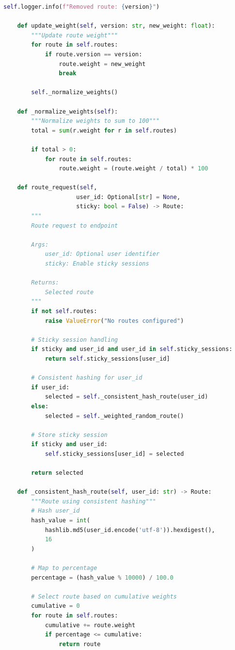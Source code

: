 \begin{lstlisting}[language=Python, caption=Advanced Traffic Router]
        self.logger.info(f"Removed route: {version}")

    def update_weight(self, version: str, new_weight: float):
        """Update route weight"""
        for route in self.routes:
            if route.version == version:
                route.weight = new_weight
                break

        self._normalize_weights()

    def _normalize_weights(self):
        """Normalize weights to sum to 100"""
        total = sum(r.weight for r in self.routes)

        if total > 0:
            for route in self.routes:
                route.weight = (route.weight / total) * 100

    def route_request(self,
                     user_id: Optional[str] = None,
                     sticky: bool = False) -> Route:
        """
        Route request to endpoint

        Args:
            user_id: Optional user identifier
            sticky: Enable sticky sessions

        Returns:
            Selected route
        """
        if not self.routes:
            raise ValueError("No routes configured")

        # Sticky session handling
        if sticky and user_id and user_id in self.sticky_sessions:
            return self.sticky_sessions[user_id]

        # Consistent hashing for user_id
        if user_id:
            selected = self._consistent_hash_route(user_id)
        else:
            selected = self._weighted_random_route()

        # Store sticky session
        if sticky and user_id:
            self.sticky_sessions[user_id] = selected

        return selected

    def _consistent_hash_route(self, user_id: str) -> Route:
        """Route using consistent hashing"""
        # Hash user_id
        hash_value = int(
            hashlib.md5(user_id.encode('utf-8')).hexdigest(),
            16
        )

        # Map to percentage
        percentage = (hash_value % 10000) / 100.0

        # Select route based on cumulative weights
        cumulative = 0
        for route in self.routes:
            cumulative += route.weight
            if percentage <= cumulative:
                return route


\end{lstlisting}
